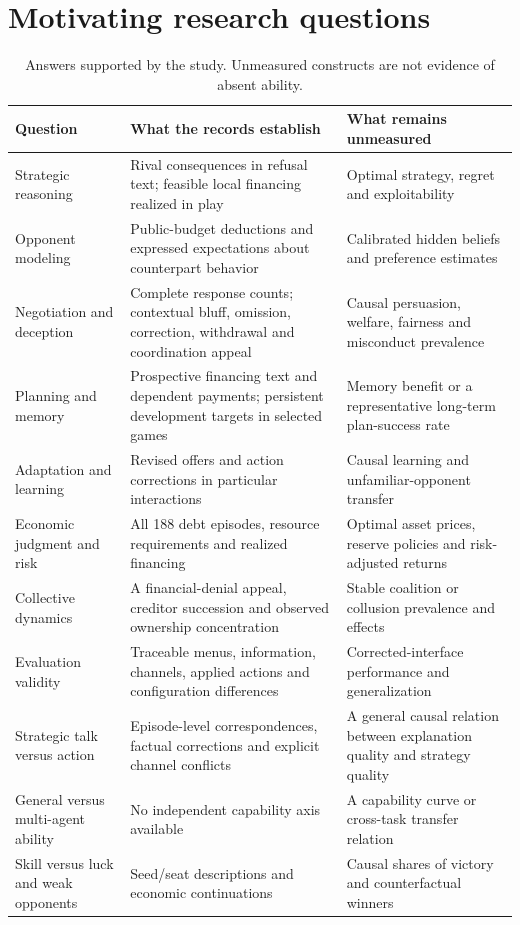 \section{Motivating research questions}
\label{app:questions}
\begin{longtable}{@{}L{.24\linewidth}L{.39\linewidth}L{.31\linewidth}@{}}
\caption{Answers supported by the study. Unmeasured constructs are not evidence of absent ability.}\\
\toprule Question & What the records establish & What remains unmeasured\\\midrule\endhead
Strategic reasoning & Rival consequences in refusal text; feasible local financing realized in play & Optimal strategy, regret and exploitability\\
Opponent modeling & Public-budget deductions and expressed expectations about counterpart behavior & Calibrated hidden beliefs and preference estimates\\
Negotiation and deception & Complete response counts; contextual bluff, omission, correction, withdrawal and coordination appeal & Causal persuasion, welfare, fairness and misconduct prevalence\\
Planning and memory & Prospective financing text and dependent payments; persistent development targets in selected games & Memory benefit or a representative long-term plan-success rate\\
Adaptation and learning & Revised offers and action corrections in particular interactions & Causal learning and unfamiliar-opponent transfer\\
Economic judgment and risk & All 188 debt episodes, resource requirements and realized financing & Optimal asset prices, reserve policies and risk-adjusted returns\\
Collective dynamics & A financial-denial appeal, creditor succession and observed ownership concentration & Stable coalition or collusion prevalence and effects\\
Evaluation validity & Traceable menus, information, channels, applied actions and configuration differences & Corrected-interface performance and generalization\\\midrule
Strategic talk versus action & Episode-level correspondences, factual corrections and explicit channel conflicts & A general causal relation between explanation quality and strategy quality\\
General versus multi-agent ability & No independent capability axis available & A capability curve or cross-task transfer relation\\
Skill versus luck and weak opponents & Seed/seat descriptions and economic continuations & Causal shares of victory and counterfactual winners\\\bottomrule
\end{longtable}

